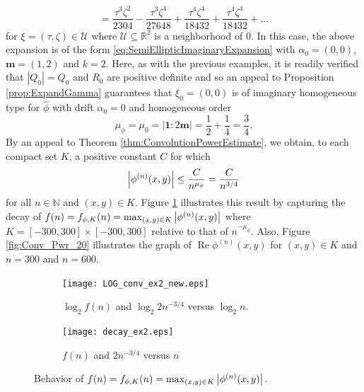 \documentclass[11pt]{article}
\newenvironment{example}
  {\pushQED{\qed}\renewcommand{\qedsymbol}{$\triangle$}\examplex}
  {\popQED\endexamplex}
\theoremstyle{remark}
\renewcommand\Re{\operatorname{Re}}%
\begin{document}
\begin{example}
\begin{equation*}
    =  \frac{\tau^3\zeta^2}{2304} - \frac{\tau^3\zeta^4}{27648} + \frac{\tau^4\zeta^4}{18432} +  \frac{\tau^4\zeta^4}{18432} + \dots
\end{equation*}
for $\xi=(\tau,\zeta)\in\mathcal{U}$ where $\mathcal{U}\subseteq\mathbb{R}^2$ is a neighborhood of $0$. In this case, the above expansion is of the form \eqref{eq:SemiEllipticImaginaryExpansion} with $\alpha_0=(0,0)$, $\mathbf{m}=(1,2)$ and $k=2$. Here, as with the previous examples, it is readily verified that $|Q_0|=Q_0$ and $R_0$ are positive definite and so an appeal to Proposition \ref{prop:ExpandGamma} guarantees that $\xi_0=(0,0)$ is of imaginary homogeneous type for $\widehat{\phi}$ with drift $\alpha_0=0$ and homogeneous order
\begin{equation*}
    \mu_\phi=\mu_0=|\mathbf{1}:2\mathbf{m}|=
    \frac{1}{2}+\frac{1}{4}=\frac{3}{4}.
\end{equation*}
By an appeal to Theorem \ref{thm:ConvolutionPowerEstimate}, we obtain, to each compact set $K$, a positive constant $C$ for which
\begin{equation}\label{eq:SecondOrderExampleDecay2}
    \abs{\phi^{(n)}(x,y)}\leq\frac{C}{n^{\mu_\phi}}=\frac{C}{n^{3/4}}
\end{equation}
for all $n\in\mathbb{N}$ and $(x,y)\in K$. Figure \ref{fig:Conv_Pwr_2} illustrates this result by capturing the decay of $f(n)=f_{\phi,K}(n)=\max_{(x,y)\in K}\abs{\phi^{(n)}(x,y)}$ where %
$K=[-300,300]\times [-300,300]$ relative to that of $n^{-\mu_\phi}$. Also, Figure \ref{fig:Conv_Pwr_20} illustrates the graph of $\Re \phi^{(n)}(x,y)$ for $(x,y)\in K$ and $n=300$ and $n=600$.


\begin{figure}[!htb]
    \begin{subfigure}{0.49\textwidth}
    \centering
    \texttt{[image: LOG\_conv\_ex2\_new.eps]}
    \caption{$\log_2 f(n)$ and  $\log_2 2n^{-3/4}$ versus $\log_2 n$.}
    \end{subfigure}
    \begin{subfigure}{0.49\textwidth}
    \centering
    \texttt{[image: decay\_ex2.eps]}
    \caption{$f(n)$ and $2n^{-3/4}$ versus $n$}
    \end{subfigure}
    \caption{Behavior of $f(n)=f_{\phi,K}(n)=\max_{(x,y)\in K}\abs{\phi^{(n)}(x,y)}$.}
    \label{fig:Conv_Pwr_2}
\end{figure}


\end{example}
\end{document}
